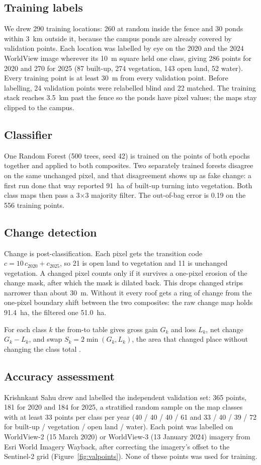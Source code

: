 \documentclass[11pt,a4paper]{article}
\begin{document}
\subsection{Training labels}
We drew 290 training locations: 260 at random inside the fence and 30 ponds within 3~km outside it, because the campus ponds are already covered by validation points. Each location was labelled by eye on the 2020 and the 2024 WorldView image wherever its 10~m square held one class, giving 286 points for 2020 and 270 for 2025 (87 built-up, 274 vegetation, 143 open land, 52 water). Every training point is at least 30~m from every validation point. Before labelling, 24 validation points were relabelled blind and 22 matched. The training stack reaches 3.5~km past the fence so the ponds have pixel values; the maps stay clipped to the campus.

\subsection{Classifier}
One Random Forest (500 trees, seed 42) is trained on the points of both epochs together and applied to both composites. Two separately trained forests disagree on the same unchanged pixel, and that disagreement shows up as fake change: a first run done that way reported 91~ha of built-up turning into vegetation. Both class maps then pass a 3$\times$3 majority filter. The out-of-bag error is 0.19 on the 556 training points.

\subsection{Change detection}
Change is post-classification. Each pixel gets the transition code $c = 10\,c_{2020} + c_{2025}$, so 21 is open land to vegetation and 11 is unchanged vegetation. A changed pixel counts only if it survives a one-pixel erosion of the change mask, after which the mask is dilated back. This drops changed strips narrower than about 30~m. Without it every roof gets a ring of change from the one-pixel boundary shift between the two composites: the raw change map holds 91.4~ha, the filtered one 51.0~ha.

For each class $k$ the from-to table gives gross gain $G_k$ and loss $L_k$, net change $G_k - L_k$, and swap $S_k = 2\min(G_k, L_k)$, the area that changed place without changing the class total \citep{pontius2004}.

\subsection{Accuracy assessment}
\label{sec:accmethod}
Krishnkant Sahu drew and labelled the independent validation set: 365 points, 181 for 2020 and 184 for 2025, a stratified random sample on the map classes with at least 33 points per class per year (40 / 40 / 40 / 61 and 33 / 40 / 39 / 72 for built-up / vegetation / open land / water). Each point was labelled on WorldView-2 (15 March 2020) or WorldView-3 (13 January 2024) imagery from Esri World Imagery Wayback, after correcting the imagery's offset to the Sentinel-2 grid (Figure~\ref{fig:valpoints}). None of these points was used for training.
\end{document}
